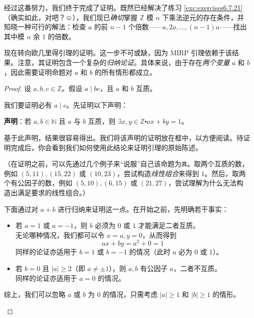 经过这番努力，我们终于完成了证明。既然已经解决了练习 \ref{exc:exercises6.7.21}（确实如此，对吧？$\smiley{}$），我们现已\emph{确切}掌握 $\mathbb{Z}$ 模 $n$ 下乘法逆元的存在条件，并知晓一种可行的解法：检查 $a$ 的前 $n-1$ 个倍数——$ a, 2a, \dots, (n-1)a$——找出其中模 $n$ 余 $1$ 的倍数。

现在转向欧几里得引理的证明。这一步不可或缺，因为 MIRP 引理依赖于该结果。注意，其证明包含一个复杂的\emph{归纳论证}。具体来说，由于存在\emph{两个变量} $a$ 和 $b$，因此需要证明命题对 $a$ 和 $b$ 的所有情形都成立。

\begin{proof}
    设 $a, b, c \in \mathbb{Z}$。假设 $a \mid bc$，且 $a$ 和 $b$ 互质。

    我们要证明必有 $a \mid c$。先证明以下声明：

    \textbf{声明}：若 $a, b \in \mathbb{N}$ 且 $a$ 与 $b$ 互质，则 $\exists x, y \in \mathbb{Z} \centerdot ax+by = 1$。

    基于此声明，结果很容易得出。我们将该声明的证明放在框中，以方便阅读。待证明完成后，你会看到我们如何使用此结论来证明引理的原始陈述。

    （在证明之前，可以先通过几个例子来``说服''自己该命题为\verb|真|。取两个互质的数，例如 $(5,11), (15,22)$ 或 $(10, 23)$，尝试构造\emph{线性组合}来得到 $1$。然后，取两个有公因子的数，例如 $(5,10), (6, 15)$ 或 $(21, 27)$，尝试理解为什么无法构造出满足要求的线性组合。）

    \begin{tcolorbox}[colback=gray!10,%
        colframe=black,%
        width=\textwidth,%
        arc=2mm, auto outer arc,
        title={证明声明},breakable,enhanced jigsaw,
        before upper={\parindent15pt\noindent},	]
            下面通过对 $a+b$ 进行归纳来证明这一点。在开始之前，先明确若干事实：
            \begin{itemize}
                \item 若 $a=1$ 或 $a=-1$，则 $b$ 必须为 $0$ 或 $1$ 才能满足二者互质。\\
                    无论哪种情况，我们都可以令 $x=a, y=0$，从而得到
                    \[ax + by = a^2 + 0 = 1\]
                    同样的论证亦适用于 $b=1$ 或 $b=-1$ 的情况（此时 $a$ 必为 $0$ 或 $1$）。
                \item 若 $b=0$ 且 $|a| \ge 2$（即 $a \ne \pm 1$），则 $a, b$ 有公因子 $a$，二者不互质。\\
                    同样的论证亦适用于 $a=0$ 的情况。
            \end{itemize}
            综上，我们可以忽略 $a$ 或 $b$ 为 $0$ 的情况，只需考虑 $|a| \ge 1$ 和 $|b| \ge 1$ 的情形。\\


\end{tcolorbox}
\end{proof}
